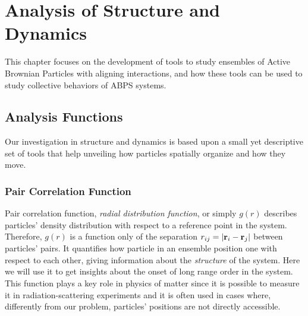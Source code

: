 \documentclass[../../master_thesis_np.tex]{subfiles}
\begin{document}
	\chapter{Analysis of Structure and Dynamics}
	This chapter focuses on the development of tools to study ensembles of Active Brownian Particles with aligning interactions, and how these tools can be used to study collective behaviors of ABPS systems.

	\section{Analysis Functions}
	Our investigation in structure and dynamics is based upon a small yet descriptive set of tools that help unveiling how particles spatially organize and how they move.
	
		\subsection{Pair Correlation Function}
		Pair correlation function, \emph{radial distribution function}, or simply $g(r)$ describes particles' density distribution with respect to a reference point in the system.
		Therefore, $g(r)$ is a function only of the separation $r_{ij} = \abs{\vb{r}_i - \vb{r}_j}$ between particles' pairs. 
		It quantifies how particle in an ensemble position one with respect to each other, giving information about the \emph{structure} of the system.
		Here we will use it to get insights about the onset of long range order in the system.
		This function plays a key role in physics of matter since it is possible to measure it in radiation-scattering experiments \cite{hansen90a} and it is often used in cases where, differently from our problem, particles' positions are not directly accessible.
		
\end{document}
